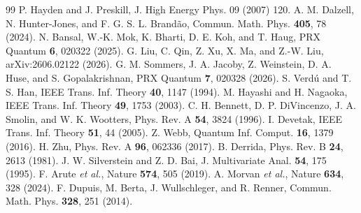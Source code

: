 \documentclass[aps,prl,twocolumn,superscriptaddress,amsmath,amssymb,10pt]{revtex4-2}
\begin{document}
\begin{thebibliography}{99}
 P. Hayden and J. Preskill, J. High Energy Phys. 09 (2007) 120.
 A. M. Dalzell, N. Hunter-Jones, and F. G. S. L. Brand\~ao, Commun. Math. Phys. \textbf{405}, 78 (2024).
 N. Bansal, W.-K. Mok, K. Bharti, D. E. Koh, and T. Haug, PRX Quantum \textbf{6}, 020322 (2025).
 G. Liu, C. Qin, Z. Xu, X. Ma, and Z.-W. Liu, arXiv:2606.02122 (2026).
 G. M. Sommers, J. A. Jacoby, Z. Weinstein, D. A. Huse, and S. Gopalakrishnan, PRX Quantum \textbf{7}, 020328 (2026).
 S. Verd\'u and T. S. Han, IEEE Trans. Inf. Theory \textbf{40}, 1147 (1994).
 M. Hayashi and H. Nagaoka, IEEE Trans. Inf. Theory \textbf{49}, 1753 (2003).
 C. H. Bennett, D. P. DiVincenzo, J. A. Smolin, and W. K. Wootters, Phys. Rev. A \textbf{54}, 3824 (1996).
 I. Devetak, IEEE Trans. Inf. Theory \textbf{51}, 44 (2005).
 Z. Webb, Quantum Inf. Comput. \textbf{16}, 1379 (2016).
 H. Zhu, Phys. Rev. A \textbf{96}, 062336 (2017).
 B. Derrida, Phys. Rev. B \textbf{24}, 2613 (1981).
 J. W. Silverstein and Z. D. Bai, J. Multivariate Anal. \textbf{54}, 175 (1995).
 F. Arute \emph{et al.}, Nature \textbf{574}, 505 (2019).
 A. Morvan \emph{et al.}, Nature \textbf{634}, 328 (2024).
 F. Dupuis, M. Berta, J. Wullschleger, and R. Renner, Commun. Math. Phys. \textbf{328}, 251 (2014).
\end{thebibliography}
\end{document}
